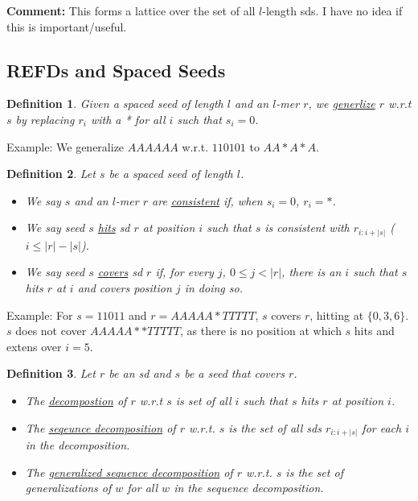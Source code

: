 \documentclass{article}
\newcommand{\und}{\underline}
\newtheorem{definition}{Definition}
\begin{document}
{\bf Comment:} This forms a lattice over the set of all
$l$-length sds.  I have no idea if this is important/useful.

\subsection{REFDs and Spaced Seeds}

\begin{definition}
Given a spaced seed of length $l$ and an $l$-mer $r$, we
\und{generlize} $r$
w.r.t $s$ by replacing $r_i$ with a * for all $i$ such that $s_i = 0$.
\end{definition}
Example: We generalize $AAAAAA$ w.r.t. $110101$ to $AA*A*A$.

\begin{definition}
  Let $s$ be a spaced seed of length $l$.
 
  \begin{itemize}
  \item We say $s$ and an $l$-mer $r$ are \und{consistent} if, when $s_i = 0$, $r_i = *$.
  \item We say seed $s$ \und{hits} sd $r$ at position $i$ such that
    $s$ is consistent with $r_{i:i+|s|}$ ($i \leq |r| - |s|$).
  \item We say seed $s$ \und{covers} sd $r$ if, for every $j$, $0 \leq
    j < |r|$, there is an $i$ such that $s$ hits $r$ at $i$ and covers
    position $j$ in doing so.
  \end{itemize}
\end{definition}

Example: For $s=11011$ and $r=AAAAA*TTTTT$, $s$ covers $r$, hitting at
$\{0,3,6\}$.  $s$ does not cover $AAAAA**TTTTT$, as there is no
position at which $s$ hits and extens over $i=5$.

\begin{definition}
  Let $r$ be an sd and $s$ be a seed that covers $r$.
\begin{itemize}
\item The \und{decompostion} of $r$ w.r.t $s$ is set of all $i$ such
  that $s$ hits $r$ at position $i$.
\item The \und{seqeunce decomposition} of $r$ w.r.t. $s$ is the set
  of all sds $r_{i:i+|s|}$ for each $i$ in the decomposition.
\item The \und{generalized sequence decomposition} of $r$ w.r.t. $s$
  is the set of generalizations of $w$ for all $w$ in the sequence decomposition.
\end{itemize}
\end{definition}
  
\end{document}
